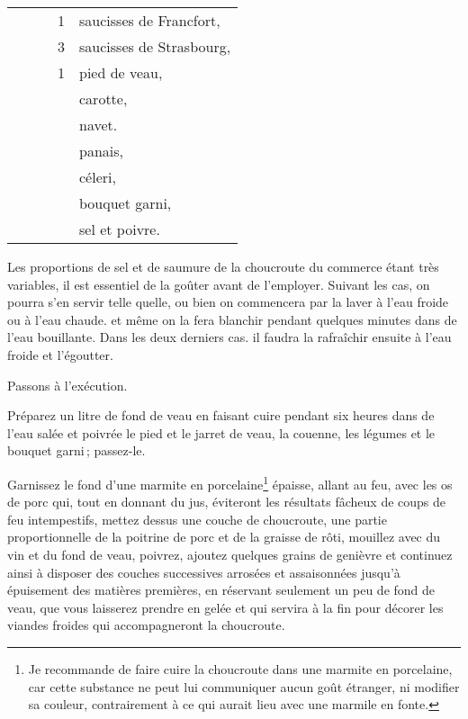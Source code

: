 \begin{longtable}{rrrrp{16em}}
  &       &         &  1 & saucisses de Francfort,                                                        \\
  &       &         &  3 & saucisses de Strasbourg,                                                       \\
  &       &         &  1 & pied de veau,                                                                  \\
  &       &         &    & carotte,                                                                       \\
  &       &         &    & navet.                                                                         \\
  &       &         &    & panais,                                                                        \\
  &       &         &    & céleri,                                                                        \\
  &       &         &    & bouquet garni,                                                                 \\
  &       &         &    & sel et poivre.                                                                 \\
\end{longtable}
\normalsize

Les proportions de sel et de saumure de la choucroute du commerce étant très
variables, il est essentiel de la goûter avant de l'employer. Suivant les cas, on
pourra s'en servir telle quelle, ou bien on commencera par la laver à l'eau froide ou
à l'eau chaude. et même on la fera blanchir pendant quelques minutes dans de
l'eau bouillante. Dans les deux derniers cas. il faudra la rafraîchir ensuite à l'eau
froide et l'égoutter.

Passons à l'exécution.

Préparez un litre de fond de veau en faisant cuire pendant six heures dans de
l'eau salée et poivrée le pied et le jarret de veau, la couenne, les légumes et le
bouquet garni ; passez-le.

Garnissez le fond d'une marmite en porcelaine\footnote{Je recommande de faire
cuire la choucroute dans une marmite en porcelaine, car cette substance ne peut
lui communiquer aucun goût étranger, ni modifier sa couleur, contrairement à ce
qui aurait lieu avec une marmile en fonte.} épaisse, allant au feu, avec les os
de porc qui, tout en donnant du jus, éviteront les résultats fâcheux de coups
de feu intempestifs, mettez dessus une couche de choucroute, une partie
proportionnelle de la poitrine de porc et de la graisse de rôti, mouillez avec
du vin et du fond de veau, poivrez, ajoutez quelques grains de genièvre et
continuez ainsi à disposer des couches successives arrosées et assaisonnées
jusqu'à épuisement des matières premières, en réservant seulement un peu de
fond de veau, que vous laisserez prendre en gelée et qui servira à la fin pour
décorer les viandes froides qui accompagneront la choucroute.

